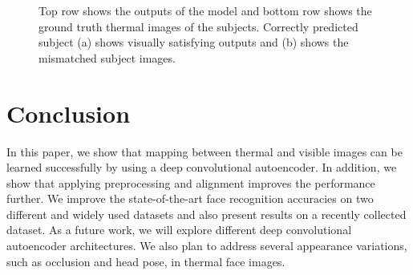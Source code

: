 \documentclass[conference]{IEEEtran}
\begin{document}
\begin{figure}[t]
    \centering
\qquad
{}
	\caption{\label{fig:modeloutput} Top row shows the outputs of the model and bottom row shows the ground truth thermal images of the subjects. Correctly predicted subject (a) shows visually satisfying outputs and (b) shows the mismatched subject images. }
\end{figure}



\section{Conclusion}
In this paper, we show that mapping between thermal and visible images can be learned successfully by using a deep convolutional autoencoder. In addition, we show that applying preprocessing and alignment improves the performance further. We improve the state-of-the-art face recognition accuracies on two different and widely used datasets and also present results on a recently collected dataset. As a future work, we will explore different deep convolutional autoencoder architectures. We also plan to address several appearance variations, such as occlusion and head pose, in thermal face images. 




\end{document}
